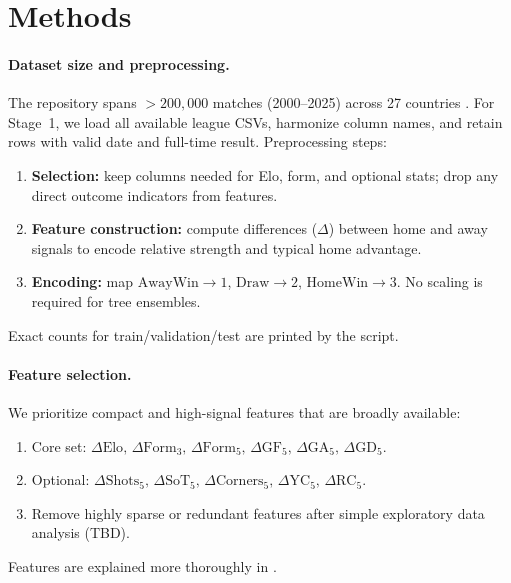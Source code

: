 \documentclass[a4paper,12pt,twoside,english]{all-in-one}
\begin{document}
\section{Methods}

\paragraph{Dataset size and preprocessing.}
The repository spans \(>\!200{,}000\) matches (2000--2025) across 27 countries \cite{xgabora_club_football_2000_2025}. For Stage~1, we load all available league CSVs, harmonize column names, and retain rows with valid date and full-time result. Preprocessing steps:
\begin{enumerate}
  \item \textbf{Selection:} keep columns needed for Elo, form, and optional stats; drop any direct outcome indicators from features.
  \item \textbf{Feature construction:} compute differences (\(\Delta\)) between home and away signals to encode relative strength and typical home advantage.
  \item \textbf{Encoding:} map \(\text{AwayWin} \to 1\), \(\text{Draw} \to 2\), \(\text{HomeWin} \to 3\). No scaling is required for tree ensembles.
\end{enumerate}
Exact counts for train/validation/test are printed by the  script.

\paragraph{Feature selection.}
We prioritize compact and high-signal features that are broadly available:
\begin{enumerate}
  \item Core set: \(\Delta\text{Elo},\,\Delta\text{Form}_3,\,\Delta\text{Form}_5,\,\Delta\text{GF}_5,\,\Delta\text{GA}_5,\,\Delta\text{GD}_5\).
  \item Optional: \(\Delta\text{Shots}_5,\,\Delta\text{SoT}_5,\,\Delta\text{Corners}_5,\,\Delta\text{YC}_5,\,\Delta\text{RC}_5\).
  \item Remove highly sparse or redundant features after simple exploratory data analysis (TBD).
\end{enumerate}
Features are explained more thoroughly in .
\end{document}
